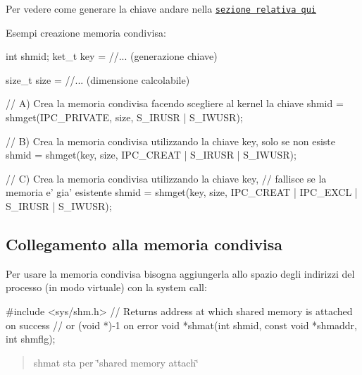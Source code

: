 Per vedere come generare la chiave andare nella \href{md_theory_generate_keys_generate_keys.html}{\tt sezione relativa qui}

Esempi creazione memoria condivisa\+: 
\begin{DoxyCode}
\textcolor{keywordtype}{int} shmid;
ket\_t key = \textcolor{comment}{//... (generazione chiave)}

\textcolor{keywordtype}{size\_t} size = \textcolor{comment}{//... (dimensione calcolabile)}

\textcolor{comment}{// A) Crea la memoria condivisa facendo scegliere al kernel la chiave}
shmid = shmget(IPC\_PRIVATE, size, S\_IRUSR | S\_IWUSR);

\textcolor{comment}{// B) Crea la memoria condivisa utilizzando la chiave key, solo se non esiste}
shmid = shmget(key, size, IPC\_CREAT | S\_IRUSR | S\_IWUSR);

\textcolor{comment}{// C) Crea la memoria condivisa utilizzando la chiave key,}
\textcolor{comment}{//    fallisce se la memoria e' gia' esistente}
shmid = shmget(key, size, IPC\_CREAT | IPC\_EXCL | S\_IRUSR | S\_IWUSR);
\end{DoxyCode}


\subsection*{Collegamento alla memoria condivisa}

Per usare la memoria condivisa bisogna aggiungerla allo spazio degli indirizzi del processo (in modo virtuale) con la system call\+:


\begin{DoxyCode}
\textcolor{preprocessor}{#include <sys/shm.h>}
\textcolor{comment}{// Returns address at which shared memory is attached on success}
\textcolor{comment}{// or (void *)-1 on error}
\textcolor{keywordtype}{void} *shmat(\textcolor{keywordtype}{int} shmid, \textcolor{keyword}{const} \textcolor{keywordtype}{void} *shmaddr, \textcolor{keywordtype}{int} shmflg);
\end{DoxyCode}
 \begin{quote}
shmat sta per \char`\"{}shared memory attach\char`\"{} \end{quote}


